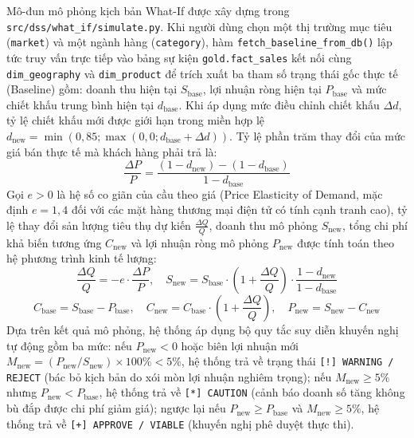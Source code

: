 Mô-đun mô phỏng kịch bản What-If được xây dựng trong \texttt{src/dss/what\_if/simulate.py}. Khi người dùng chọn một thị trường mục tiêu (\texttt{market}) và một ngành hàng (\texttt{category}), hàm \texttt{fetch\_baseline\_from\_db()} lập tức truy vấn trực tiếp vào bảng sự kiện \texttt{gold.fact\_sales} kết nối cùng \texttt{dim\_geography} và \texttt{dim\_product} để trích xuất ba tham số trạng thái gốc thực tế (Baseline) gồm: doanh thu hiện tại $S_{\text{base}}$, lợi nhuận ròng hiện tại $P_{\text{base}}$ và mức chiết khấu trung bình hiện tại $d_{\text{base}}$. Khi áp dụng mức điều chỉnh chiết khấu $\Delta d$, tỷ lệ chiết khấu mới được giới hạn trong miền hợp lệ $d_{\text{new}} = \min(0,85; \max(0,0; d_{\text{base}} + \Delta d))$. Tỷ lệ phần trăm thay đổi của mức giá bán thực tế mà khách hàng phải trả là:
\begin{equation}
    \frac{\Delta P}{P} = \frac{(1 - d_{\text{new}}) - (1 - d_{\text{base}})}{1 - d_{\text{base}}}
\end{equation}
Gọi $e > 0$ là hệ số co giãn của cầu theo giá (Price Elasticity of Demand, mặc định $e = 1,4$ đối với các mặt hàng thương mại điện tử có tính cạnh tranh cao), tỷ lệ thay đổi sản lượng tiêu thụ dự kiến $\frac{\Delta Q}{Q}$, doanh thu mô phỏng $S_{\text{new}}$, tổng chi phí khả biến tương ứng $C_{\text{new}}$ và lợi nhuận ròng mô phỏng $P_{\text{new}}$ được tính toán theo hệ phương trình kinh tế lượng:
\begin{equation}
    \frac{\Delta Q}{Q} = -e \cdot \frac{\Delta P}{P}, \quad
    S_{\text{new}} = S_{\text{base}} \cdot \left(1 + \frac{\Delta Q}{Q}\right) \cdot \frac{1 - d_{\text{new}}}{1 - d_{\text{base}}}
\end{equation}
\begin{equation}
    C_{\text{base}} = S_{\text{base}} - P_{\text{base}}, \quad
    C_{\text{new}} = C_{\text{base}} \cdot \left(1 + \frac{\Delta Q}{Q}\right), \quad
    P_{\text{new}} = S_{\text{new}} - C_{\text{new}}
\end{equation}
Dựa trên kết quả mô phỏng, hệ thống áp dụng bộ quy tắc suy diễn khuyến nghị tự động gồm ba mức: nếu $P_{\text{new}} < 0$ hoặc biên lợi nhuận mới $M_{\text{new}} = (P_{\text{new}}/S_{\text{new}})\times 100\% < 5\%$, hệ thống trả về trạng thái \texttt{[!] WARNING / REJECT} (bác bỏ kịch bản do xói mòn lợi nhuận nghiêm trọng); nếu $M_{\text{new}} \ge 5\%$ nhưng $P_{\text{new}} < P_{\text{base}}$, hệ thống trả về \texttt{[*] CAUTION} (cảnh báo doanh số tăng không bù đắp được chi phí giảm giá); ngược lại nếu $P_{\text{new}} \ge P_{\text{base}}$ và $M_{\text{new}} \ge 5\%$, hệ thống trả về \texttt{[+] APPROVE / VIABLE} (khuyến nghị phê duyệt thực thi).

